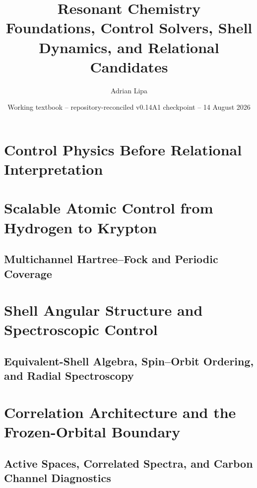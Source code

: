 \documentclass[11pt,a4paper,oneside]{book}
\title{Resonant Chemistry\\[0.35em]\large Foundations, Control Solvers, Shell Dynamics, and Relational Candidates}
\author{Adrian Lipa}
\date{Working textbook -- repository-reconciled v0.14A1 checkpoint -- 14 August 2026}
\begin{document}
\frontmatter
\maketitle
\tableofcontents


\mainmatter

\part{Control Physics Before Relational Interpretation}








\part{Scalable Atomic Control from Hydrogen to Krypton}
\chapter{Multichannel Hartree--Fock and Periodic Coverage}
\label{ch:scalable-atomic-control}




\part{Shell Angular Structure and Spectroscopic Control}
\chapter{Equivalent-Shell Algebra, Spin--Orbit Ordering, and Radial Spectroscopy}
\label{ch:angular-spectroscopy}




\part{Correlation Architecture and the Frozen-Orbital Boundary}
\chapter{Active Spaces, Correlated Spectra, and Carbon Channel Diagnostics}
\label{ch:correlation-architecture}





\end{document}
